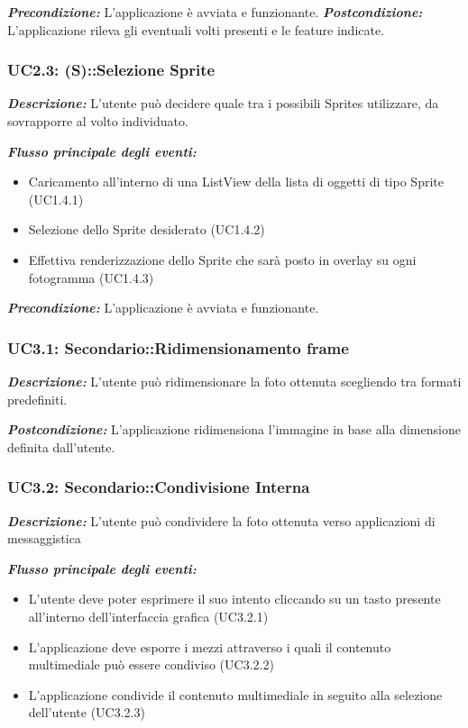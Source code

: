 \textbf{\textit{Precondizione:}} L'applicazione è avviata e funzionante.
\textbf{\textit{Postcondizione:}} L'applicazione rileva gli eventuali volti presenti e le feature indicate.

\subsubsection{UC2.3: (S)::Selezione Sprite}

\textbf{\textit{Descrizione:}} L'utente può decidere quale tra i possibili Sprites utilizzare, da sovrapporre al volto individuato.

\textbf{\textit{Flusso principale degli eventi:}} 

\begin{itemize}
\item Caricamento all'interno di una ListView della lista di oggetti di tipo Sprite (UC1.4.1)
\item Selezione dello Sprite desiderato (UC1.4.2)
\item Effettiva renderizzazione dello Sprite che sarà posto in overlay su ogni fotogramma (UC1.4.3)
\end{itemize}

\textbf{\textit{Precondizione:}} L'applicazione è avviata e funzionante.

\subsubsection{UC3.1: Secondario::Ridimensionamento frame}

\textbf{\textit{Descrizione:}} L'utente può ridimensionare la foto ottenuta scegliendo tra formati predefiniti.

\textbf{\textit{Postcondizione:}} L'applicazione ridimensiona l'immagine in base alla dimensione definita dall'utente.


\subsubsection{UC3.2: Secondario::Condivisione Interna}

\textbf{\textit{Descrizione:}} L'utente può condividere la foto ottenuta verso applicazioni di messaggistica

\textbf{\textit{Flusso principale degli eventi:}} 

\begin{itemize}
\item L'utente deve poter esprimere il suo intento cliccando su un tasto presente all'interno dell'interfaccia grafica (UC3.2.1)
\item L'applicazione deve esporre i mezzi attraverso i quali il contenuto multimediale può essere condiviso (UC3.2.2)
\item L'applicazione condivide il contenuto multimediale in seguito alla selezione dell'utente (UC3.2.3)
\end{itemize}

